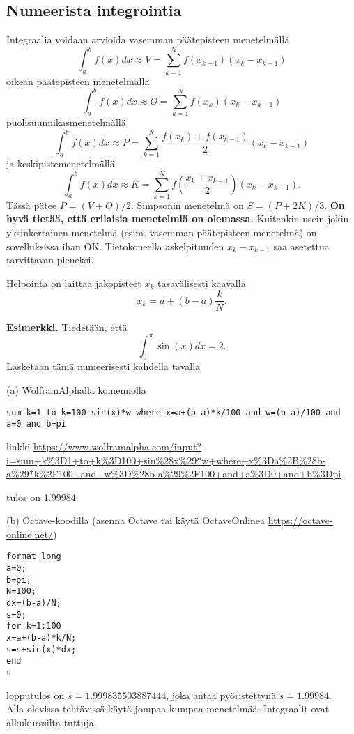 \documentclass[10pt]{article}
\newcommand{\brac}[1]{\left(#1\right)}
\begin{document}
\newpage
\subsection{Numeerista integrointia}

Integraalia voidaan arvioida vasemman päätepisteen menetelmällä
$$
\int_a^b f(x)dx
\approx V=\sum_{k=1}^{N} f(x_{k-1})(x_k-x_{k-1})
$$
oikean päätepisteen menetelmällä
$$
\int_a^b f(x)dx
\approx O=\sum_{k=1}^{N} f(x_k)(x_k-x_{k-1})
$$
puolisuunnikasmenetelmällä
$$
\int_a^b f(x)dx
\approx P=\sum_{k=1}^{N} \frac{f(x_k)+f(x_{k-1})}{2}(x_k-x_{k-1})
$$
ja keskipistemenetelmällä
$$
\int_a^b f(x)dx
\approx K=\sum_{k=1}^{N} f\brac{\frac{x_k+x_{k-1}}{2}}(x_k-x_{k-1}).
$$
Tässä pätee $P=(V+O)/2$. Simpsonin menetelmä on $S=(P+2K)/3$. \textbf{On hyvä tietää, että erilaisia menetelmiä on olemassa.} Kuitenkin usein jokin yksinkertainen menetelmä (esim. vasemman päätepisteen menetelmä) on sovelluksissa ihan OK. Tietokoneella askelpituuden $x_k-x_{k-1}$ saa asetettua tarvittavan pieneksi.

Helpointa on laittaa jakopisteet $x_k$ tasavälisesti kaavalla
$$
x_k=a+(b-a)\frac{k}{N}.
$$

\textbf{Esimerkki.} Tiedetään, että
$$
\int_0^\pi \sin(x)dx=2.
$$
Lasketaan tämä numeerisesti kahdella tavalla

(a) WolframAlphalla komennolla

\begin{verbatim}
sum k=1 to k=100 sin(x)*w where x=a+(b-a)*k/100 and w=(b-a)/100 and a=0 and b=pi
\end{verbatim}

linkki \url{https://www.wolframalpha.com/input?i=sum+k%3D1+to+k%3D100+sin%28x%29*w+where+x%3Da%2B%28b-a%29*k%2F100+and+w%3D%28b-a%29%2F100+and+a%3D0+and+b%3Dpi}

tulos on 1.99984.

(b) Octave-koodilla (asenna Octave tai käytä OctaveOnlinea \url{https://octave-online.net/})

\begin{verbatim}
format long
a=0;
b=pi;
N=100;
dx=(b-a)/N;
s=0;
for k=1:100
x=a+(b-a)*k/N;
s=s+sin(x)*dx;
end
s
\end{verbatim}

lopputulos on $s=1.999835503887444$, joka antaa pyöristettynä $s=1.99984$.\\

Alla olevissa tehtävissä käytä jompaa kumpaa menetelmää. Integraalit ovat alkukurssilta tuttuja.
\end{document}
